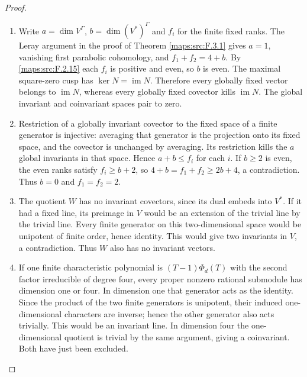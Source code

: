 \documentclass[11pt,a4paper]{article}
\numberwithin{equation}{section}
\theoremstyle{definition}
\begin{document}
\begin{proof}
\begin{enumerate}[label=\arabic*.]
\item Write $a=\dim V^\Gamma$, $b=\dim(V^*)^\Gamma$ and $f_i$
for the finite fixed ranks.  The Leray argument in the proof of Theorem \ref{maps:src:F.3.1} gives $a=1$,
vanishing first parabolic cohomology, and
$f_1+f_2=4+b$.  By \ref{maps:src:F.2.15} each $f_i$ is positive and even, so $b$ is
even.  The maximal square-zero cusp has
$\ker N=\operatorname{im}N$.  Therefore every globally
fixed vector belongs to $\operatorname{im}N$, whereas every
globally fixed covector kills $\operatorname{im}N$.
The global invariant and coinvariant spaces pair to zero.

\item Restriction of a globally invariant covector to the fixed
space of a finite generator is injective: averaging that
generator is the projection onto its fixed space, and the
covector is unchanged by averaging.  Its restriction kills
the $a$ global invariants in that space.  Hence
$a+b\leq f_i$ for each $i$.
If $b\geq2$ is even, the even ranks satisfy
$f_i\geq b+2$, so $4+b=f_1+f_2\geq2b+4$, a contradiction.
Thus $b=0$ and $f_1=f_2=2$.

\item The quotient $W$ has no invariant covectors, since its dual
embeds into $V^*$.  If it had a fixed line, its preimage in
$V$ would be an extension of the trivial line by the trivial
line.  Every finite generator on this two-dimensional
space would be unipotent of finite order, hence identity.
This would give two invariants in $V$, a contradiction.
Thus $W$ also has no invariant vectors.

\item If one finite characteristic polynomial is
$(T-1)\Phi_d(T)$ with the second factor irreducible of degree
four, every proper nonzero rational submodule has dimension
one or four.  In dimension one that generator acts as the
identity.  Since the product of the two finite generators
is unipotent, their induced one-dimensional characters are
inverse; hence the other generator also acts trivially.
This would be an invariant line.  In dimension four the
one-dimensional quotient is trivial by the same argument,
giving a coinvariant.  Both have just been excluded.

\end{enumerate}
\end{proof}
\end{document}
